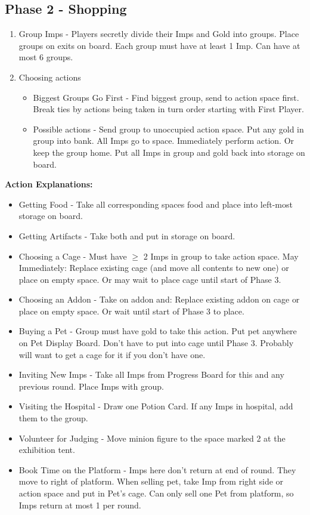 \documentclass[12pt]{article}
\newenvironment{enumerateCustom}
{\begin{enumerate}
  \setlength{\itemsep}{1pt}
  \setlength{\parskip}{0pt}
  \setlength{\parsep}{0pt}}
{\end{enumerate}}
\newenvironment{itemizeCustom}
{\begin{itemize}
  \setlength{\itemsep}{1pt}
  \setlength{\parskip}{0pt}
  \setlength{\parsep}{0pt}}
{\end{itemize}}
\begin{document}
\begin{multicols*}{2}
\subsection*{Phase 2 - Shopping}
\begin{enumerateCustom}
	\item Group Imps - Players secretly divide their Imps and Gold into groups. Place groups on exits on board. Each group must have at least 1 Imp. Can have at most 6 groups.
	\item Choosing actions
		\begin{itemizeCustom}
			\item Biggest Groups Go First - Find biggest group, send to action space first. Break ties by actions being taken in turn order starting with First Player.
			\item Possible actions - Send group to unoccupied action space. Put any gold in group into bank. All Imps go to space. Immediately perform action. Or keep the group home. Put all Imps in group and gold back into storage on board.
		\end{itemizeCustom}
\end{enumerateCustom}

\textbf{Action Explanations:}
\begin{itemizeCustom}
	\item Getting Food - Take all corresponding spaces food and place into left-most storage on board.
	\item Getting Artifacts - Take both and put in storage on board.
	\item Choosing a Cage - Must have $\ge$ 2 Imps in group to take action space. May Immediately: Replace existing cage (and move all contents to new one) or place on empty space. Or may wait to place cage until start of Phase 3.
	\item Choosing an Addon - Take on addon and: Replace existing addon on cage or place on empty space. Or wait until start of Phase 3 to place.
	\item Buying a Pet - Group must have gold to take this action. Put pet anywhere on Pet Display Board. Don't have to put into cage until Phase 3. Probably will want to get a cage for it if you don't have one.
	\item Inviting New Imps - Take all Imps from Progress Board for this and any previous round. Place Imps with group.
	\item Visiting the Hospital - Draw one Potion Card. If any Imps in hospital, add them to the group.
	\item Volunteer for Judging - Move minion figure to the space marked 2 at the exhibition tent.
	\item Book Time on the Platform - Imps here don't return at end of round. They move to right of platform. When selling pet, take Imp from right side or action space and put in Pet's cage. Can only sell one Pet from platform, so Imps return at most 1 per round.
\end{itemizeCustom}


\end{multicols*}
\end{document}
